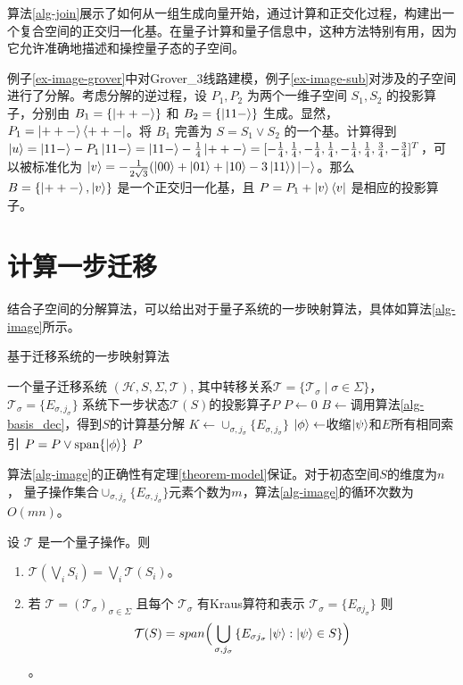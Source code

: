 算法\ref{alg-join}展示了如何从一组生成向量开始，通过计算和正交化过程，构建出一个复合空间的正交归一化基。在量子计算和量子信息中，这种方法特别有用，因为它允许准确地描述和操控量子态的子空间。

\begin{example}
    例子\ref{ex-image-grover}中对Grover\_3线路建模，例子\ref{ex-image-sub}对涉及的子空间进行了分解。考虑分解的逆过程，设 $P_1,P_2$ 为两个一维子空间 $S_1,S_2$ 的投影算子，分别由 $B_1=\{\ket{++-}\}$ 和 $B_2=\{\ket{11-}\}$ 生成。显然，$P_1=\ket{++-}\bra{++-}$。将 $B_1$ 完善为 $S=S_1\vee S_2$ 的一个基。计算得到$\ket{u}=\ket{11-}-P_1\ket{11-}=\ket{11-}-\frac{1}{4}\ket{++-}=[-\frac{1}{4},\frac{1}{4},-\frac{1}{4},\frac{1}{4},-\frac{1}{4},\frac{1}{4},\frac{3}{4},-\frac{3}{4}]^T$，可以被标准化为 $\ket{v}=-\frac{1}{2\sqrt{3}}(\ket{00}+\ket{01}+\ket{10}-3\ket{11})\ket{-}$。那么 $B=\{\ket{++-},\ket{v}\}$ 是一个正交归一化基，且 $P=P_1+\ket{v}\bra{v}$ 是相应的投影算子。
\end{example}
\section{计算一步迁移}
结合子空间的分解算法，可以给出对于量子系统的一步映射算法，具体如算法\ref{alg-image}所示。
\begin{algorithm}
\caption{基于迁移系统的一步映射算法}
\label{alg-image}
\begin{algorithmic}[1] %
\Require 一个量子迁移系统 $(\mathcal{H},S,\Sigma,\mathcal{T})$, 其中转移关系$\mathcal{T}=\{\mathcal{T}_\sigma\mid \sigma\in \Sigma\}$，  $\mathcal{T}_\sigma=\{E_{\sigma,j_\sigma}\}$
\Ensure 系统下一步状态$\mathcal{T}(S)$的投影算子$P$
\State $P \gets 0$ 
\State $B \gets $调用算法\ref{alg-basis_dec}，得到$S$的计算基分解
\State $K \gets \cup_{\sigma,j_\sigma}\{E_{\sigma,j_\sigma}\}$
    \State $\ket{\phi} \gets $收缩\(\ket{\psi}\)和\(E\)所有相同索引
    \State $P=P \vee \text{span}\{\ket{\phi}\}$
\EndFor
\State \Return $P$ 
\end{algorithmic}
\end{algorithm}

算法\ref{alg-image}的正确性有定理\ref{theorem-model}保证。对于初态空间$S$的维度为$n$， 量子操作集合$\cup_{\sigma,j_\sigma}\{E_{\sigma,j_\sigma}\}$元素个数为$m$，算法\ref{alg-image}的循环次数为$O(mn)$。
\begin{theorem}\citep{2021}
    \label{theorem-model}
    设 $\mathcal{T}$ 是一个量子操作。则
\begin{enumerate}
    \item $\mathcal{T}(\bigvee_{i}{S_i})=\bigvee_{i}{\mathcal{T}(S_i)}$。
    \item 若 $\mathcal{T}=(\mathcal{T}_\sigma)_{\sigma \in \Sigma}$ 且每个 $\mathcal{T}_{\sigma}$ 有Kraus算符和表示 $\mathcal{T}_{\sigma}= \{ E_{\sigma j_\sigma} \}$
则
$$\mathcal{T}(S)=span\Big(\bigcup_{\sigma,j_\sigma}{\{E_{\sigma j_\sigma}\ket{\psi}:\ket{\psi}\in S\}}\Big)$$。
\end{enumerate}
\end{theorem}


